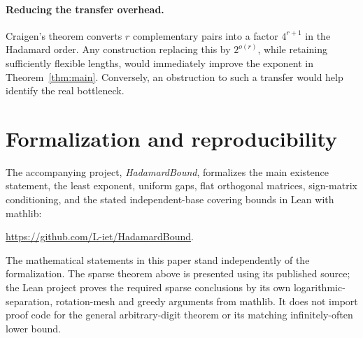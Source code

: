 \documentclass[11pt]{article}
\begin{document}
\paragraph{Reducing the transfer overhead.}
Craigen's theorem converts $r$ complementary pairs into a factor $4^{r+1}$ in the Hadamard order.  Any construction replacing this by $2^{o(r)}$, while retaining sufficiently flexible lengths, would immediately improve the exponent in Theorem~\ref{thm:main}.  Conversely, an obstruction to such a transfer would help identify the real bottleneck.

\section{Formalization and reproducibility}\label{sec:formalization}
The accompanying project, \emph{HadamardBound}, formalizes the main
existence statement, the least exponent, uniform gaps, flat orthogonal
matrices, sign-matrix conditioning, and the stated independent-base
covering bounds in Lean with mathlib:
\begin{center}
\url{https://github.com/L-iet/HadamardBound}.
\end{center}
The mathematical statements in this paper stand independently of the
formalization. The sparse theorem above is presented using its published
source; the Lean project proves the required sparse conclusions by its
own logarithmic-separation, rotation-mesh and greedy arguments from
mathlib. It does not import proof code for the general arbitrary-digit
theorem or its matching infinitely-often lower bound.
\end{document}
